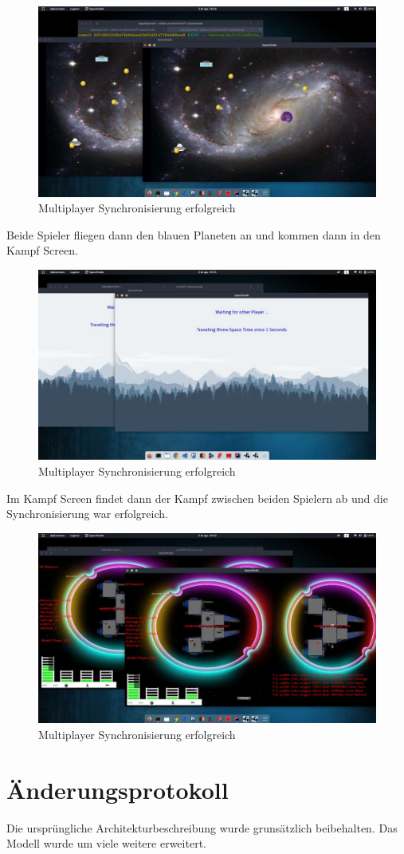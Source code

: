 \documentclass[12pt]{article}
\begin{document}
\begin{figure}[htp]
	\centering
	\includegraphics[scale=0.4]{TestProtocolBilder/Multiplayer/5.jpg}
	\caption{Multiplayer Synchronisierung erfolgreich}
\end{figure}
\clearpage
Beide Spieler fliegen dann den blauen Planeten an und kommen dann in den Kampf Screen.
\begin{figure}[htp]
	\centering
	\includegraphics[scale=0.4]{TestProtocolBilder/Multiplayer/6.jpg}
	\caption{Multiplayer Synchronisierung erfolgreich}
\end{figure}
\clearpage
Im Kampf Screen findet dann der Kampf zwischen beiden Spielern ab und die Synchronisierung war erfolgreich.
\begin{figure}[htp]
	\centering
	\includegraphics[scale=0.4]{TestProtocolBilder/Multiplayer/7.jpg}
	\caption{Multiplayer Synchronisierung erfolgreich}
\end{figure}

\section{Änderungsprotokoll}
Die ursprüngliche Architekturbeschreibung wurde grunsätzlich beibehalten. Das Modell wurde um viele weitere erweitert.
\end{document}

